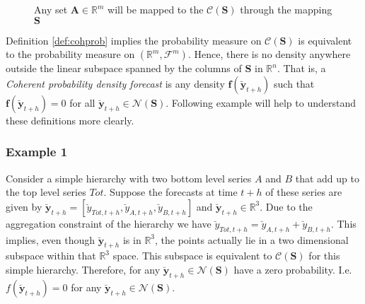 \documentclass[a4paper, 11pt]{article}
\begin{document}
\begin{figure}[H]
  \begin{center}
    \newline
  \end{center}
  \caption{Any set $\bm{A} \in \mathbb{R}^m$ will be mapped to the $\mathscr{C}(\bm{S})$ through the mapping $\bm{S}$}
\end{figure}

Definition \ref{def:cohprob} implies the probability measure on $\mathscr{C}(\bm{S})$ is equivalent to the probability measure on $(\mathbb{R}^m, \bm{\mathscr{F}}^m)$. Hence, there is no density anywhere outside the linear subspace spanned by the columns of $\bm{S}$ in $\mathbb{R}^n$. That is, a \textit{Coherent probability density forecast} is any density $\bm{f}(\breve{\bm{y}}_{t+h})$ such that $\bm{f}(\breve{\bm{y}}_{t+h})=0$ for all $\breve{\bm{y}}_{t+h} \in \mathscr{N}(\bm{S})$. Following example will help to understand these definitions more clearly.

\subsubsection*{Example 1}

Consider a simple hierarchy with two bottom level series $A$ and $B$ that add up to the top level series $Tot$. Suppose the forecasts at time $t+h$ of these series are given by $\breve{\bm{y}}_{t+h} = [\breve{y}_{Tot,t+h},\breve{y}_{A,t+h}, \breve{y}_{B,t+h}]$ and $\breve{\bm{y}}_{t+h} \in \mathbb{R}^3$. Due to the aggregation constraint of the hierarchy we have $\breve{y}_{Tot,t+h}=\breve{y}_{A,t+h}+\breve{y}_{B,t+h}$. This implies, even though  $\breve{\bm{y}}_{t+h}$ is in $\mathbb{R}^3$, the points actually lie in a two dimensional subspace within that $\mathbb{R}^3$ space. This subspace is equivalent to $\mathscr{C}(\bm{S})$ for this simple hierarchy. Therefore, for any $\breve{\bm{y}}_{t+h} \in \mathscr{N}(\bm{S})$ have a zero probability. I.e. $f(\breve{\bm{y}}_{t+h})=0$ for any $\breve{\bm{y}}_{t+h} \in \mathscr{N}(\bm{S})$.
\end{document}
